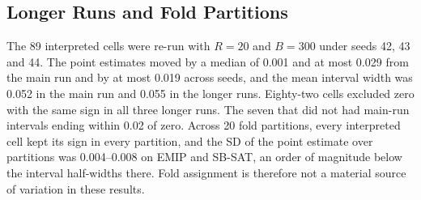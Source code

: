 \subsection{Longer Runs and Fold Partitions}\label{sec:conv}
The 89 interpreted cells were re-run with $R = 20$ and $B = 300$ under seeds 42, 43 and 44. The point estimates moved by a median of 0.001 and at most 0.029 from the main run and by at most 0.019 across seeds, and the mean interval width was 0.052 in the main run and 0.055 in the longer runs. Eighty-two cells excluded zero with the same sign in all three longer runs. The seven that did not had main-run intervals ending within 0.02 of zero. Across 20 fold partitions, every interpreted cell kept its sign in every partition, and the SD of the point estimate over partitions was 0.004--0.008 on EMIP and SB-SAT, an order of magnitude below the interval half-widths there. Fold assignment is therefore not a material source of variation in these results.

